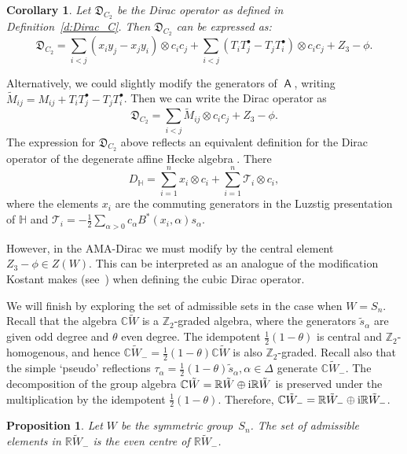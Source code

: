 \documentclass[10pt,a4paper]{amsart}
\numberwithin{equation}{section}
\newtheorem{Corollary}[Theorem]{Corollary}
\newtheorem{Proposition}[Theorem]{Proposition}
 { \theoremstyle{definition}
\newtheorem{Definition}[Theorem]{Definition}
\newtheorem{Note}[Theorem]{Note}
\newtheorem{Example}[Theorem]{Example}
\newtheorem{Remark}[Theorem]{Remark} }
\newcommand{\bbc}{\mathbb{C}}
\newcommand{\bbr}{\mathbb{R}}
\newcommand{\bbz}{\mathbb{Z}}
\DeclareMathOperator{\ama}{\mathsf{A}}
\begin{document}
\begin{Corollary}
Let $\mathfrak{D}_{C_2}$ be the Dirac operator as defined in Definition~{\rm \ref{d:Dirac_C}}. Then $\mathfrak{D}_{C_2}$ can be expressed as:
\[\mathfrak{D}_{C_2} = \sum_{i <j} (x_iy_j - x_jy_i) \otimes c_ic_j +\sum_{i<j}( T_iT_j^\bullet - T_jT_i^\bullet) \otimes c_ic_j + Z_3 - \phi.\]
\end{Corollary}

\begin{Remark}
Alternatively, we could slightly modify the generators of $\ama$, writing $\tilde{M}_{ij} = M_{ij} + T_iT_j^\bullet - T_jT_i^\bullet$. Then we can write the Dirac operator as
\[\mathfrak{D}_{C_2} = \sum_{i <j} \tilde{M}_{ij} \otimes c_ic_j + Z_3 - \phi.\]
The expression for $\mathfrak{D}_{C_2}$ above reflects an equivalent definition for the Dirac operator of the degenerate affine Hecke algebra \cite{BCT12}. There
\[D_\mathbb{H} = \sum_{i=1}^n x_i \otimes c_i + \sum_{i=1}^n \mathcal{T}_i \otimes c_i,
\]
where the elements $x_i$ are the commuting generators in the Luzstig presentation of $\mathbb{H}$ and $\mathcal{T}_i =-\frac{1}{2} \sum_{\alpha >0} c_\alpha B^*(x_i,\alpha)s_\alpha$.

However, in the AMA-Dirac we must modify by the central element $Z_3 - \phi \in Z(W)$. This can be interpreted as an analogue of the modification Kostant makes (see~\cite{K03}) when defining the cubic Dirac operator.
\end{Remark}

We will finish by exploring the set of admissible sets in the case when $W=S_n$. Recall that the algebra $\bbc \tilde{W}$ is a $\bbz_2$-graded algebra, where the generators $\tilde{s}_\alpha$ are given odd degree and $\theta$ even degree. The idempotent $\frac{1}{2} (1-\theta)$ is central and $\bbz_2$-homogenous, and hence $\bbc \tilde{W}_- =\frac{1}{2}(1-\theta)\bbc \tilde{W}$ is also $\bbz_2$-graded. Recall also that the simple `pseudo' reflections $\tau_\alpha = \frac{1}{2} (1 - \theta) \tilde{s}_\alpha, \alpha \in \Delta$ generate $\mathbb{C}\tilde{W}_-$.
The decomposition of the group algebra $\bbc \tilde{W} = \bbr \tilde{W} \oplus {\rm i} \bbr \tilde{W}$ is preserved under the multiplication by the idempotent $\frac{1}{2} (1 - \theta)$. Therefore, $\bbc \tilde{W}_- = \bbr \tilde{W}_- \oplus {\rm i} \bbr \tilde{W}_-$.

\begin{Proposition}\label{p::admissible} Let $W$ be the symmetric group~$S_n$. The set of admissible elements in $\mathbb{R}\tilde{W}_-$ is the even centre of $\mathbb{R}\tilde{W}_-$. \end{Proposition}
\end{document}

